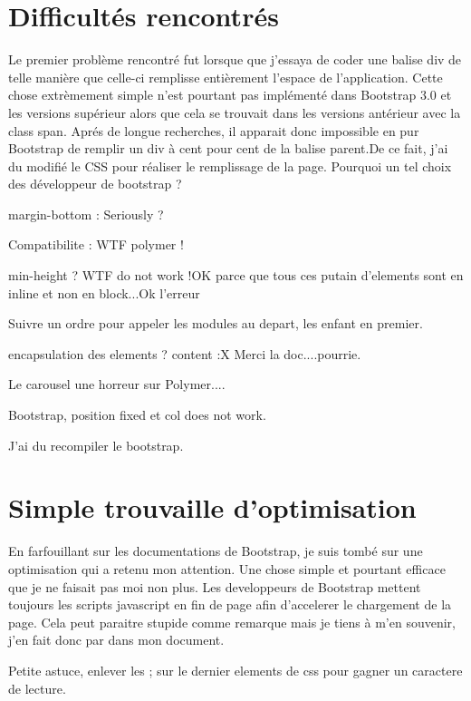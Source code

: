 \documentclass{article}
\begin{document}
\newpage
\section{Difficult\'es rencontr\'es}
\hspace*{0.6cm}Le premier probl\`eme rencontr\'e fut lorsque que j'essaya de coder une balise div de telle mani\`ere que celle-ci remplisse enti\`erement l'espace de l'application. Cette chose extr\`emement simple n'est pourtant pas impl\'ement\'e dans Bootstrap 3.0 et les versions sup\'erieur alors que cela se trouvait dans les versions ant\'erieur avec la class span. Apr\'es de longue recherches, il apparait donc impossible en pur Bootstrap de remplir un div \`a cent pour cent de la balise parent.De ce fait, j'ai du modifi\'e le CSS pour r\'ealiser le remplissage de la page. Pourquoi un tel choix des d\'eveloppeur de bootstrap ?

margin-bottom : Seriously ?

Compatibilite : WTF polymer !

min-height ? WTF do not work !OK parce que tous ces putain d'elements sont en inline et non en block...Ok l'erreur

Suivre un ordre pour appeler les modules au depart, les enfant en premier.

encapsulation des elements ? content :X Merci la doc....pourrie.

Le carousel une horreur sur Polymer....

Bootstrap, position fixed et col does not work.

J'ai du recompiler le bootstrap.

\section{Simple trouvaille d'optimisation}
En farfouillant sur les documentations de Bootstrap, je suis tomb\'e sur une optimisation qui a retenu mon attention. Une chose simple et pourtant efficace que je ne faisait pas moi non plus. Les developpeurs de Bootstrap mettent toujours les scripts javascript en fin de page afin d'accelerer le chargement de la page. Cela peut paraitre stupide comme remarque mais je tiens \`a m'en souvenir, j'en fait donc par dans mon document.

Petite astuce, enlever les ; sur le dernier elements de css pour gagner un caractere de lecture.
\end{document}
